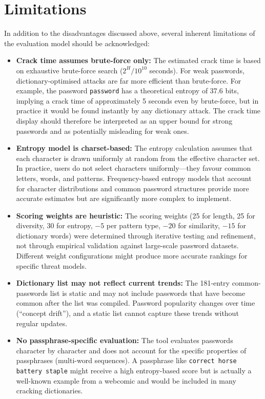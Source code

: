\clearpage

\section{Limitations}

In addition to the disadvantages discussed above, several inherent limitations of the evaluation model should be acknowledged:

\begin{itemize}
    \item \textbf{Crack time assumes brute-force only:} The estimated crack time is based on exhaustive brute-force search ($2^{H} / 10^{10}$ seconds). For weak passwords, dictionary-optimised attacks are far more efficient than brute-force. For example, the password \texttt{password} has a theoretical entropy of 37.6 bits, implying a crack time of approximately 5 seconds even by brute-force, but in practice it would be found instantly by any dictionary attack. The crack time display should therefore be interpreted as an upper bound for strong passwords and as potentially misleading for weak ones.

    \item \textbf{Entropy model is charset-based:} The entropy calculation assumes that each character is drawn uniformly at random from the effective character set. In practice, users do not select characters uniformly---they favour common letters, words, and patterns. Frequency-based entropy models that account for character distributions and common password structures provide more accurate estimates but are significantly more complex to implement.

    \item \textbf{Scoring weights are heuristic:} The scoring weights (25 for length, 25 for diversity, 30 for entropy, $-5$ per pattern type, $-20$ for similarity, $-15$ for dictionary words) were determined through iterative testing and refinement, not through empirical validation against large-scale password datasets. Different weight configurations might produce more accurate rankings for specific threat models.

    \item \textbf{Dictionary list may not reflect current trends:} The 181-entry common-passwords list is static and may not include passwords that have become common after the list was compiled. Password popularity changes over time (``concept drift''), and a static list cannot capture these trends without regular updates.

    \item \textbf{No passphrase-specific evaluation:} The tool evaluates passwords character by character and does not account for the specific properties of passphrases (multi-word sequences). A passphrase like \texttt{correct horse battery staple} might receive a high entropy-based score but is actually a well-known example from a webcomic and would be included in many cracking dictionaries.
\end{itemize}
